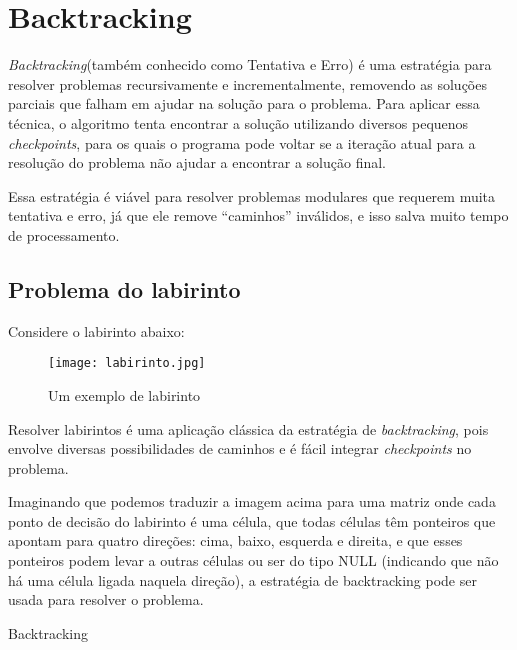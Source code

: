 \section{Backtracking} \label{sec:backtracking}

\emph{Backtracking}(também conhecido como Tentativa e Erro) é uma estratégia para resolver problemas recursivamente e incrementalmente,
removendo as soluções parciais que falham em ajudar na solução para o problema. Para aplicar essa
técnica, o algoritmo tenta encontrar a solução utilizando diversos pequenos \emph{checkpoints}, para os
quais o programa pode voltar se a iteração atual para a resolução do problema não ajudar a encontrar a
solução final.

Essa estratégia é viável para resolver problemas modulares que requerem muita tentativa e erro, já que ele
remove “caminhos” inválidos, e isso salva muito tempo de processamento.

\subsection{Problema do labirinto}

Considere o labirinto abaixo:

\begin{figure}[ht]
  \centering
  \texttt{[image: labirinto.jpg]}
  \caption{Um exemplo de labirinto}
  \label{fig:labirinto}
\end{figure}

Resolver labirintos é uma aplicação clássica da estratégia de \emph{backtracking}, pois envolve diversas
possibilidades de caminhos e é fácil integrar \emph{checkpoints} no problema.

Imaginando que podemos traduzir a imagem acima para uma matriz onde cada ponto de decisão do
labirinto é uma célula, que todas células têm ponteiros que apontam para quatro direções: cima, baixo,
esquerda e direita, e que esses ponteiros podem levar a outras células ou ser do tipo NULL (indicando que
não há uma célula ligada naquela direção), a estratégia de backtracking pode ser usada para resolver o
problema.

\begin{algorithm}
  \caption{Backtracking}
  \begin{algorithmic}[1]
  \EndIf
  \EndIf
  \EndIf
  \EndIf
  \EndFor
  \EndProcedure
  \end{algorithmic}
\end{algorithm}

\newpage